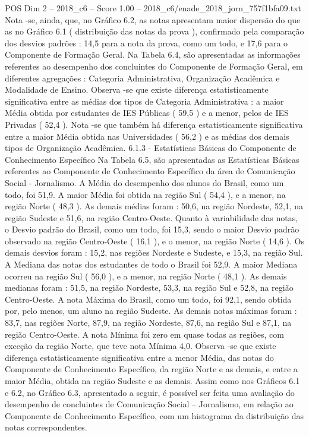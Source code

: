 \begin{textsample}{POS Dim 2 – 2018\_c6 – Score 1.00 – 2018\_c6/enade\_2018\_jorn\_757f1bfa09.txt}
Nota -se, ainda, que, no Gráfico 6.2, as notas apresentam maior dispersão do que as no Gráfico 6.1 ( distribuição das notas da prova ), confirmado pela comparação dos desvios padrões : 14,5 para a nota da prova, como um todo, e 17,6 para o Componente de Formação Geral.
Na Tabela 6.4, são apresentadas as informações referentes ao desempenho dos concluintes do Componente de Formação Geral, em diferentes agregações : Categoria Administrativa, Organização Acadêmica e Modalidade de Ensino.
Observa -se que existe diferença estatisticamente significativa entre as médias dos tipos de Categoria Administrativa : a maior Média obtida por estudantes de IES Públicas ( 59,5 ) e a menor, pelos de IES Privadas ( 52,4 ).
Nota -se que também há diferença estatisticamente significativa entre a maior Média obtida nas Universidades ( 56,2 ) e as médias dos demais tipos de Organização Acadêmica. 6.1.3 - Estatísticas Básicas do Componente de Conhecimento Específico Na Tabela 6.5, são apresentadas as Estatísticas Básicas referentes ao Componente de Conhecimento Específico da área de Comunicação Social - Jornalismo.
A Média do desempenho dos alunos do Brasil, como um todo, foi 51,9.
A maior Média foi obtida na região Sul ( 54,4 ), e a menor, na região Norte ( 48,3 ).
As demais médias foram : 50,6, na região Nordeste, 52,1, na região Sudeste e 51,6, na região Centro-Oeste.
Quanto à variabilidade das notas, o Desvio padrão do Brasil, como um todo, foi 15,3, sendo o maior Desvio padrão observado na região Centro-Oeste ( 16,1 ), e o menor, na região Norte ( 14,6 ).
Os demais desvios foram : 15,2, nas regiões Nordeste e Sudeste, e 15,3, na região Sul.
A Mediana das notas dos estudantes de todo o Brasil foi 52,9.
A maior Mediana ocorreu na região Sul ( 56,0 ), e a menor, na região Norte ( 48,1 ).
As demais medianas foram : 51,5, na região Nordeste, 53,3, na região Sul e 52,8, na região Centro-Oeste.
A nota Máxima do Brasil, como um todo, foi 92,1, sendo obtida por, pelo menos, um aluno na região Sudeste.
As demais notas máximas foram : 83,7, nas regiões Norte, 87,9, na região Nordeste, 87,6, na região Sul e 87,1, na região Centro-Oeste.
A nota Mínima foi zero em quase todas as regiões, com exceção da região Norte, que teve nota Mínima 4,0.
Observa -se que existe diferença estatisticamente significativa entre a menor Média, das notas do Componente de Conhecimento Específico, da região Norte e as demais, e entre a maior Média, obtida na região Sudeste e as demais.
Assim como nos Gráficos 6.1 e 6.2, no Gráfico 6.3, apresentado a seguir, é possível ser feita uma avaliação do desempenho de concluintes de Comunicação Social – Jornalismo, em relação ao Componente de Conhecimento Específico, com um histograma da distribuição das notas correspondentes.

\end{textsample}

